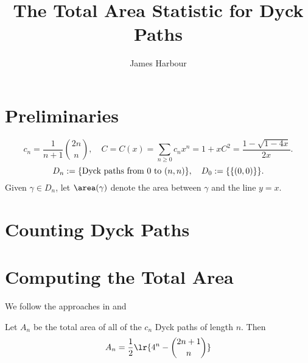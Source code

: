 \documentclass[12pt]{article}
\title{The Total Area Statistic for Dyck Paths}
\author{James Harbour}
\begin{document}
\maketitle
\tableofcontents


\section{Preliminaries}

\[
  c_{n} = \frac{1}{n+1}\binom{2n}{n},\quad C=C(x)=\sum_{n\geq0}c_{n}x^{n} = 1+xC^{2}=\frac{1-\sqrt{1-4x}}{2x}.
\]
\[
  D_{n} := \{\text{Dyck paths from 0 to $ (n,n) $}\}, \quad D_{0} := \{\{(0,0)\}\}.
\]
Given $ \gamma\in D_{n} $, let $ \area(\gamma) $ denote the area between $ \gamma $ and the line $ y=x $.
\section{Counting Dyck Paths}

\section{Computing the Total Area}

We follow the approaches in \cite{cheng:07} and \cite{msv:96}

\begin{theorem}
  Let $ A_{n} $ be the total area of all of the $ c_{n} $ Dyck paths of length $ n $. Then 
  \[
    A_{n} = \frac{1}{2}\lr{4^{n}-\binom{2n+1}{n}}
  \]
\end{theorem}
\end{document}
